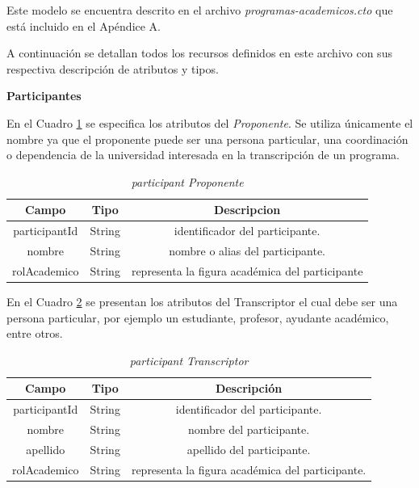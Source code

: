 Este modelo se encuentra descrito en el archivo \textit{programas-academicos.cto} que está incluido en el Apéndice A.

A continuación se detallan todos los recursos definidos en este archivo con sus respectiva descripción de atributos y tipos.

\textbf{Participantes}

En el Cuadro \ref{tabla:proponente} se especifica los atributos del  \textit{Proponente}. Se utiliza únicamente el nombre ya que el proponente puede ser una persona particular, una coordinación o dependencia de la universidad interesada en la transcripción de un programa.

\begin{table}[H]
    \captionsetup{justification=raggedleft}
    \caption{\textit{participant Proponente}}
    \centering
    \begin{tabular}{ |c|c|c| }
        \hline
        \textbf{Campo} & \textbf{Tipo} & \textbf{Descripcion} \\ 
             \hline
             participantId & String     & identificador del participante.\\
             nombre        & String     & nombre o alias del participante. \\
             rolAcademico & String & representa la figura académica del participante\\
        \hline
    \end{tabular}
    \label{tabla:proponente}
\end{table}


En el Cuadro \ref{tabla:transcriptor} se presentan los atributos del  Transcriptor el cual debe ser una persona particular, por ejemplo un estudiante, profesor, ayudante académico, entre otros.

\begin{table}[H]
    \caption{\textit{participant Transcriptor}}
    \centering
        \begin{tabular}{ |c|c|c| }
            \hline
            \textbf{Campo} & \textbf{Tipo} & \textbf{Descripción} \\
                 \hline
                 participantId & String     & identificador del participante.\\
                 nombre        & String     & nombre  del participante. \\
                 apellido      & String     & apellido del participante.\\
                 rolAcademico & String & representa la figura académica del participante.\\
                 \hline
        \end{tabular}
    \label{tabla:transcriptor}
\end{table}

